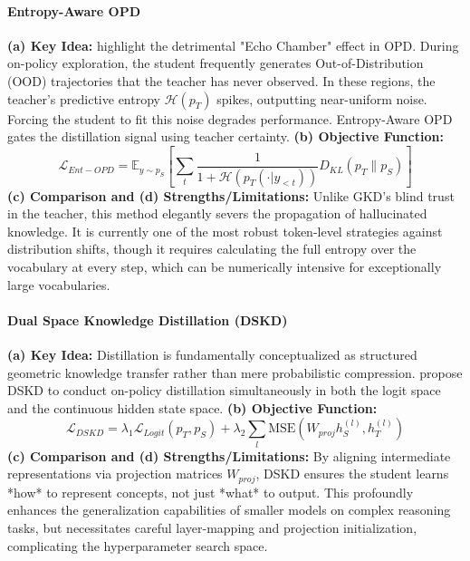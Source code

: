 \documentclass{article} %
\begin{document}
\paragraph{Entropy-Aware OPD}
\textbf{(a) Key Idea:} \citet{2603.07079} highlight the detrimental "Echo Chamber" effect in OPD. During on-policy exploration, the student frequently generates Out-of-Distribution (OOD) trajectories that the teacher has never observed. In these regions, the teacher's predictive entropy $\mathcal{H}(p_T)$ spikes, outputting near-uniform noise. Forcing the student to fit this noise degrades performance. Entropy-Aware OPD gates the distillation signal using teacher certainty.
\textbf{(b) Objective Function:}
\begin{equation}
    \mathcal{L}_{Ent-OPD} = \mathbb{E}_{y \sim p_S} \left[ \sum_t \frac{1}{1 + \mathcal{H}(p_T(\cdot|y_{<t}))} D_{KL}(p_T \parallel p_S) \right]
\end{equation}
\textbf{(c) Comparison and (d) Strengths/Limitations:} Unlike GKD's blind trust in the teacher, this method elegantly severs the propagation of hallucinated knowledge. It is currently one of the most robust token-level strategies against distribution shifts, though it requires calculating the full entropy over the vocabulary at every step, which can be numerically intensive for exceptionally large vocabularies.

\paragraph{Dual Space Knowledge Distillation (DSKD)}
\textbf{(a) Key Idea:} Distillation is fundamentally conceptualized as structured geometric knowledge transfer rather than mere probabilistic compression. \citet{2502.12018} propose DSKD to conduct on-policy distillation simultaneously in both the logit space and the continuous hidden state space. 
\textbf{(b) Objective Function:}
\begin{equation}
    \mathcal{L}_{DSKD} = \lambda_1 \mathcal{L}_{Logit}(p_T, p_S) + \lambda_2 \sum_{l} \text{MSE}\left( W_{proj} h_S^{(l)}, h_T^{(l)} \right)
\end{equation}
\textbf{(c) Comparison and (d) Strengths/Limitations:} By aligning intermediate representations via projection matrices $W_{proj}$, DSKD ensures the student learns *how* to represent concepts, not just *what* to output. This profoundly enhances the generalization capabilities of smaller models on complex reasoning tasks, but necessitates careful layer-mapping and projection initialization, complicating the hyperparameter search space.
\end{document}
